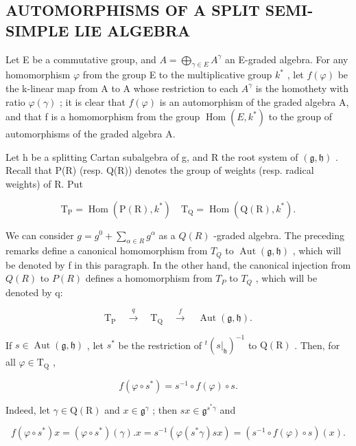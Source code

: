 \subsection{AUTOMORPHISMS OF A SPLIT SEMI-SIMPLE LIE ALGEBRA}

Let E be a commutative group, and \(A = \bigoplus_{\gamma \in E} A^{\gamma}\) an E-graded algebra. For any homomorphism \(\varphi\) from the group E to the multiplicative group \(k^{*}\) , let \(f(\varphi)\) be the k-linear map from A to A whose restriction to each \(A^{\gamma}\) is the homothety with ratio \(\varphi(\gamma)\) ; it is clear that \(f(\varphi)\) is an automorphism of the graded algebra A, and that f is a homomorphism from the group \(\operatorname{Hom}(E, k^{*})\) to the group of automorphisms of the graded algebra A.

Let h be a splitting Cartan subalgebra of g, and R the root system of \((\mathfrak{g}, \mathfrak{h})\) . Recall that P(R) (resp. Q(R)) denotes the group of weights (resp. radical weights) of R. Put

\[
\mathrm{T} _ {\mathrm{P}} = \operatorname{Hom} (\mathrm{P} (\mathrm{R}), k ^ {*}) \quad \mathrm{T} _ {\mathrm{Q}} = \operatorname{Hom} (\mathrm{Q} (\mathrm{R}), k ^ {*}).
\]

We can consider \(g = g^{0} + \sum_{\alpha \in R} g^{\alpha}\) as a \(Q(R)\) -graded algebra. The preceding remarks define a canonical homomorphism from \(T_{Q}\) to \(\operatorname{Aut}(\mathfrak{g}, \mathfrak{h})\) , which will be denoted by f in this paragraph. In the other hand, the canonical injection from \(Q(R)\) to \(P(R)\) defines a homomorphism from \(T_{P}\) to \(T_{Q}\) , which will be denoted by q:

\[
\mathrm{T} _ {\mathrm{P}} \quad \stackrel {{q}} {{\longrightarrow}} \quad \mathrm{T} _ {\mathrm{Q}} \quad \stackrel {{f}} {{\longrightarrow}} \quad \operatorname{Aut} (\mathfrak {g}, \mathfrak {h}).
\]

If \(s \in \operatorname{Aut}(\mathfrak{g}, \mathfrak{h})\) , let \(s^*\) be the restriction of \({}^t(s|_{\mathfrak{h}})^{-1}\) to \(\mathrm{Q}(\mathrm{R})\) . Then, for all \(\varphi \in \mathrm{T}_{\mathrm{Q}}\) ,

\[
f (\varphi \circ s ^ {*}) = s ^ {- 1} \circ f (\varphi) \circ s.\tag{1}
\]

Indeed, let \(\gamma \in \mathrm{Q}(\mathrm{R})\) and \(x\in \mathfrak{g}^{\gamma}\) ; then \(sx\in \mathfrak{g}^{s^{*}\gamma}\) and

\[
f (\varphi \circ s ^ {*}) x = (\varphi \circ s ^ {*}) (\gamma). x = s ^ {- 1} (\varphi (s ^ {*} \gamma) s x) = (s ^ {- 1} \circ f (\varphi) \circ s) (x).
\]

